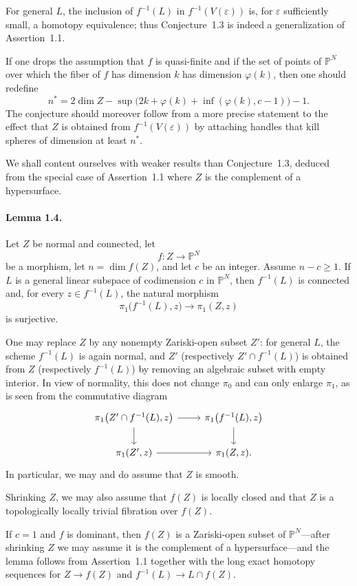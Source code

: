\documentclass[11pt]{amsart}
\newcommand{\PP}{\mathbb{P}}
\begin{document}
For general $L$, the inclusion of $f^{-1}(L)$ in $f^{-1}(V(\varepsilon))$ is, for $\varepsilon$ sufficiently small, a homotopy equivalence; thus Conjecture~1.3 is indeed a generalization of Assertion~1.1.

If one drops the assumption that $f$ is quasi-finite and if the set of points of $\PP^N$ over which the fiber of $f$ has dimension $k$ has dimension $\varphi(k)$, then one should redefine
\[
n^*=2\dim Z-\sup\bigl(2k+\varphi(k)+\inf(\varphi(k),c-1)\bigr)-1.
\]
The conjecture should moreover follow from a more precise statement to the effect that $Z$ is obtained from $f^{-1}(V(\varepsilon))$ by attaching handles that kill spheres of dimension at least $n^*$.

We shall content ourselves with weaker results than Conjecture~1.3, deduced from the special case of Assertion~1.1 where $Z$ is the complement of a hypersurface.

\paragraph{\textbf{Lemma 1.4.}}
Let $Z$ be normal and connected, let
\[
f\colon Z\to \PP^N
\]
be a morphism, let $n=\dim f(Z)$, and let $c$ be an integer. Assume $n-c\ge 1$. If $L$ is a general linear subspace of codimension $c$ in $\PP^N$, then $f^{-1}(L)$ is connected and, for every $z\in f^{-1}(L)$, the natural morphism
\[
\pi_1\bigl(f^{-1}(L),z\bigr)\to \pi_1(Z,z)
\]
is surjective.

One may replace $Z$ by any nonempty Zariski-open subset $Z'$: for general $L$, the scheme $f^{-1}(L)$ is again normal, and $Z'$ (respectively $Z'\cap f^{-1}(L)$) is obtained from $Z$ (respectively $f^{-1}(L)$) by removing an algebraic subset with empty interior. In view of normality, this does not change $\pi_0$ and can only enlarge $\pi_1$, as is seen from the commutative diagram
\[
\begin{tikzcd}
\pi_1\bigl(Z'\cap f^{-1}(L),z\bigr) \arrow[r] \arrow[d] &
\pi_1\bigl(f^{-1}(L),z\bigr) \arrow[d] \\
\pi_1(Z',z) \arrow[r] &
\pi_1(Z,z).
\end{tikzcd}
\]
In particular, we may and do assume that $Z$ is smooth.

Shrinking $Z$, we may also assume that $f(Z)$ is locally closed and that $Z$ is a topologically locally trivial fibration over $f(Z)$.

If $c=1$ and $f$ is dominant, then $f(Z)$ is a Zariski-open subset of $\PP^N$---after shrinking $Z$ we may assume it is the complement of a hypersurface---and the lemma follows from Assertion~1.1 together with the long exact homotopy sequences for $Z\to f(Z)$ and $f^{-1}(L)\to L\cap f(Z)$.
\end{document}
